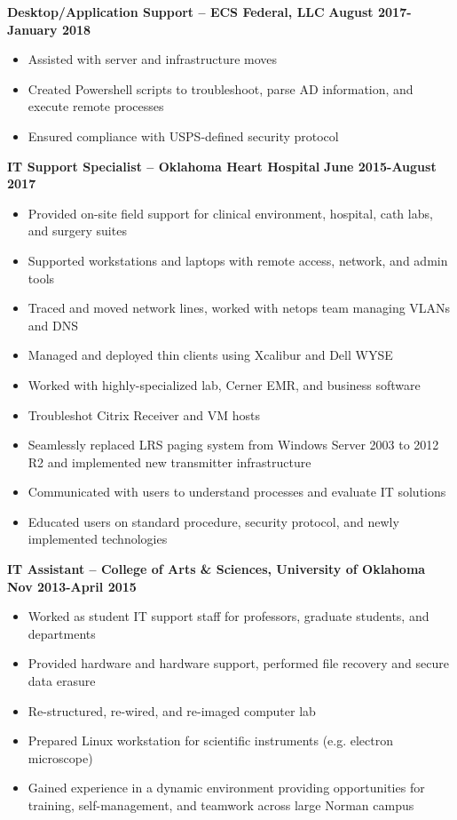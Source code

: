\documentclass[line]{res}
\begin{document}
\begin{resume}
\textbf{Desktop/Application Support -- ECS Federal, LLC}
\newline
\textbf{August 2017-January 2018}
\begin{itemize}
    \item Assisted with server and infrastructure moves
    \item Created Powershell scripts to troubleshoot, parse AD information, and execute remote processes
    \item Ensured compliance with USPS-defined security protocol
\end{itemize}

\textbf{IT Support Specialist -- Oklahoma Heart Hospital}
\newline
\textbf{June 2015-August 2017}
\begin{itemize}
	\item Provided on-site field support for clinical environment, hospital, cath labs, and surgery suites
	\item Supported workstations and laptops with remote access, network, and admin tools
	\item Traced and moved network lines, worked with netops team managing VLANs and DNS		
	\item Managed and deployed thin clients using Xcalibur and Dell WYSE
	\item Worked with highly-specialized lab, Cerner EMR, and business software
	\item Troubleshot Citrix Receiver and VM hosts
	\item Seamlessly replaced LRS paging system from Windows Server 2003 to 2012 R2 and implemented new transmitter infrastructure
	\item Communicated with users to understand processes and evaluate IT solutions
	\item Educated users on standard procedure, security protocol, and newly implemented technologies
\end{itemize}


\textbf{IT Assistant -- College of Arts \& Sciences, University of Oklahoma}
\newline
\textbf{Nov 2013-April 2015}
\begin{itemize}
	\item Worked as student IT support staff for professors, graduate students, and departments
	\item Provided hardware and hardware support, performed file recovery and secure data erasure
	\item Re-structured, re-wired, and re-imaged computer lab
	\item Prepared Linux workstation for scientific instruments (e.g. electron microscope)		
	\item Gained experience in a dynamic environment providing opportunities for training, self-management, and teamwork across large Norman campus
\end{itemize}



\end{resume}
\end{document}
